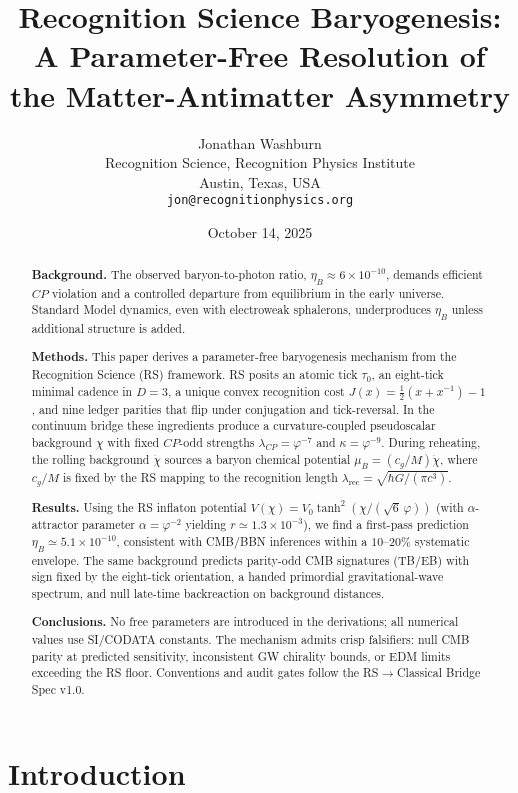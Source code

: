 \documentclass[11pt]{article}
\title{Recognition Science Baryogenesis: A Parameter-Free Resolution of the Matter-Antimatter Asymmetry}
\author{Jonathan Washburn\\
Recognition Science, Recognition Physics Institute\\
Austin, Texas, USA\\
\texttt{jon@recognitionphysics.org}}
\date{October 14, 2025}
\begin{document}
\maketitle

\begin{abstract}
\noindent\textbf{Background.}
The observed baryon-to-photon ratio, $\eta_B \approx 6\times 10^{-10}$, demands efficient $CP$ violation and a controlled departure from equilibrium in the early universe. Standard Model dynamics, even with electroweak sphalerons, underproduces $\eta_B$ unless additional structure is added.

\medskip\noindent\textbf{Methods.}
This paper derives a parameter-free baryogenesis mechanism from the Recognition Science (RS) framework. RS posits an atomic tick $\tau_0$, an eight-tick minimal cadence in $D=3$, a unique convex recognition cost $J(x)=\tfrac{1}{2}(x+x^{-1})-1$, and nine ledger parities that flip under conjugation and tick-reversal. In the continuum bridge these ingredients produce a curvature-coupled pseudoscalar background $\chi$ with fixed $CP$-odd strengths $\lambda_{CP}=\varphi^{-7}$ and $\kappa=\varphi^{-9}$. During reheating, the rolling background $\dot{\chi}$ sources a baryon chemical potential $\mu_B=(c_g/M)\dot{\chi}$, where $c_g/M$ is fixed by the RS mapping to the recognition length $\lambda_{\mathrm{rec}}=\sqrt{\hbar G/(\pi c^3)}$.

\medskip\noindent\textbf{Results.}
Using the RS inflaton potential $V(\chi)=V_0\tanh^2(\chi/(\sqrt{6}\,\varphi))$ (with $\alpha$-attractor parameter $\alpha=\varphi^{-2}$ yielding $r\simeq 1.3\times 10^{-3}$), we find a first-pass prediction $\eta_B\simeq 5.1\times 10^{-10}$, consistent with CMB/BBN inferences within a $10$--$20\%$ systematic envelope. The same background predicts parity-odd CMB signatures (TB/EB) with sign fixed by the eight-tick orientation, a handed primordial gravitational-wave spectrum, and null late-time backreaction on background distances.

\medskip\noindent\textbf{Conclusions.}
No free parameters are introduced in the derivations; all numerical values use SI/CODATA constants. The mechanism admits crisp falsifiers: null CMB parity at predicted sensitivity, inconsistent GW chirality bounds, or EDM limits exceeding the RS floor. Conventions and audit gates follow the RS$\to$Classical Bridge Spec v1.0.
\end{abstract}

\section{Introduction}
\end{document}
